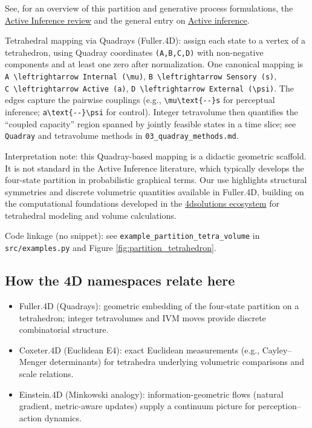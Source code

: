 \documentclass[
  10pt,
]{article}
\providecommand{\tightlist}{%
  \setlength{\itemsep}{0pt}\setlength{\parskip}{0pt}}
\begin{document}
See, for an overview of this partition and generative process
formulations, the
\href{https://discovery.ucl.ac.uk/id/eprint/10176959/1/1-s2.0-S1571064523001094-main.pdf}{Active
Inference review} and the general entry on
\href{https://en.wikipedia.org/wiki/Active_inference}{Active inference}.

Tetrahedral mapping via Quadrays (Fuller.4D): assign each state to a
vertex of a tetrahedron, using Quadray coordinates \texttt{(A,B,C,D)}
with non-negative components and at least one zero after normalization.
One canonical mapping is
\texttt{A\ \textbackslash{}leftrightarrow\ Internal\ (\textbackslash{}mu)},
\texttt{B\ \textbackslash{}leftrightarrow\ Sensory\ (s)},
\texttt{C\ \textbackslash{}leftrightarrow\ Active\ (a)},
\texttt{D\ \textbackslash{}leftrightarrow\ External\ (\textbackslash{}psi)}.
The edges capture the pairwise couplings (e.g.,
\texttt{\textbackslash{}mu\textbackslash{}text\{-\/-\}s} for perceptual
inference; \texttt{a\textbackslash{}text\{-\/-\}\textbackslash{}psi} for
control). Integer tetravolume then quantifies the ``coupled capacity''
region spanned by jointly feasible states in a time slice; see
\texttt{Quadray} and tetravolume methods in
\texttt{03\_quadray\_methods.md}.

Interpretation note: this Quadray-based mapping is a didactic geometric
scaffold. It is not standard in the Active Inference literature, which
typically develops the four-state partition in probabilistic graphical
terms. Our use highlights structural symmetries and discrete volumetric
quantities available in Fuller.4D, building on the computational
foundations developed in the
\href{https://github.com/4dsolutions}{4dsolutions ecosystem} for
tetrahedral modeling and volume calculations.

Code linkage (no snippet): see
\texttt{example\_partition\_tetra\_volume} in \texttt{src/examples.py}
and Figure \ref{fig:partition_tetrahedron}.

\hypertarget{how-the-4d-namespaces-relate-here}{%
\subsection{How the 4D namespaces relate
here}\label{how-the-4d-namespaces-relate-here}}

\begin{itemize}
\tightlist
\item
  Fuller.4D (Quadrays): geometric embedding of the four-state partition
  on a tetrahedron; integer tetravolumes and IVM moves provide discrete
  combinatorial structure.
\item
  Coxeter.4D (Euclidean E4): exact Euclidean measurements (e.g.,
  Cayley--Menger determinants) for tetrahedra underlying volumetric
  comparisons and scale relations.
\item
  Einstein.4D (Minkowski analogy): information-geometric flows (natural
  gradient, metric-aware updates) supply a continuum picture for
  perception--action dynamics.
\end{itemize}
\end{document}
